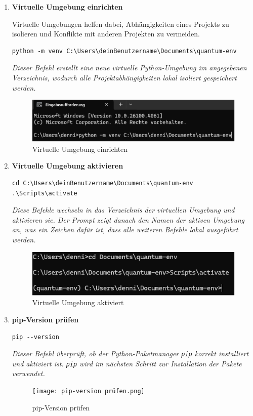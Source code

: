 \begin{enumerate}
    \item \textbf{Virtuelle Umgebung einrichten} 
    
Virtuelle Umgebungen helfen dabei, Abhängigkeiten eines Projekts zu isolieren und Konflikte mit anderen Projekten zu vermeiden.
    \begin{verbatim}
python -m venv C:\Users\deinBenutzername\Documents\quantum-env
    \end{verbatim}
\textit{Dieser Befehl erstellt eine neue virtuelle Python-Umgebung im angegebenen Verzeichnis, wodurch alle Projektabhängigkeiten lokal isoliert gespeichert werden. }
    \begin{figure}
        \centering
        \includegraphics[width=1\linewidth]{Virtuelle Umgebung einrichten.png}
        \caption{Virtuelle Umgebung einrichten}
        \label{fig:enter-label}
    \end{figure}

 \item \textbf{Virtuelle Umgebung aktivieren}
    \begin{verbatim}
cd C:\Users\deinBenutzername\Documents\quantum-env
.\Scripts\activate
    \end{verbatim}
\textit{Diese Befehle wechseln in das Verzeichnis der virtuellen Umgebung und aktivieren sie.  Der Prompt zeigt danach den Namen der aktiven Umgebung an, was ein Zeichen dafür ist, dass alle weiteren Befehle lokal ausgeführt werden. }
    \begin{figure}
        \centering
        \includegraphics[width=1\linewidth]{Virtuelle Umgebung aktiviert.png}
        \caption{Virtuelle Umgebung aktiviert}
        \label{fig:enter-label}
    \end{figure}

    \item \textbf{pip-Version prüfen}
    \begin{verbatim}
pip --version
    \end{verbatim}
\textit{Dieser Befehl überprüft, ob der Python-Paketmanager \texttt{pip} korrekt installiert und aktiviert ist.  \texttt{pip} wird im nächsten Schritt zur Installation der Pakete verwendet. }
    \begin{figure}
        \centering
        \texttt{[image: pip-version prüfen.png]}
        \caption{pip-Version prüfen}
        \label{fig:enter-label}
    \end{figure}
\end{enumerate}

